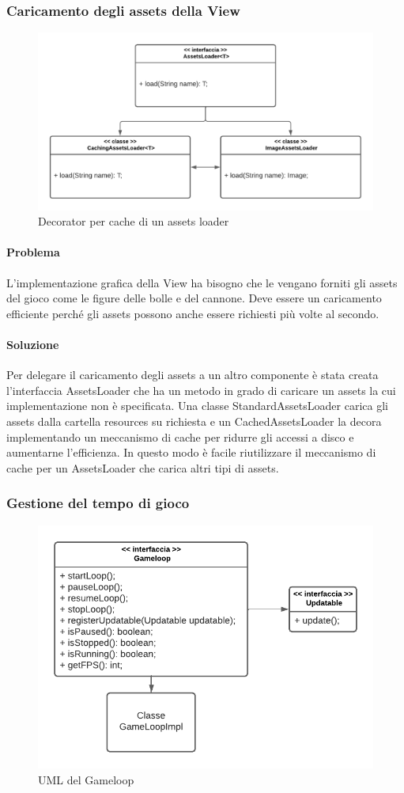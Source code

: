 \documentclass[a4paper,12pt]{report}
\begin{document}
\subsubsection{Caricamento degli assets della View}

\begin{figure}[H]
	\centering{}
	\includegraphics[width=.7\textwidth]{img/assetsloader}
	\caption{Decorator per cache di un assets loader}
\end{figure}

\paragraph{Problema} L'implementazione grafica della View ha bisogno che le vengano forniti gli assets del gioco come le figure delle bolle e del cannone. Deve essere un caricamento efficiente perché gli assets
possono anche essere richiesti più volte al secondo.

\paragraph{Soluzione} Per delegare il caricamento degli assets a un altro componente è stata creata l'interfaccia AssetsLoader che ha un metodo in grado di caricare un assets la cui implementazione
non è specificata. Una classe StandardAssetsLoader carica gli assets dalla cartella resources su richiesta e un CachedAssetsLoader la decora implementando un meccanismo di cache per ridurre gli accessi a disco
e aumentarne l'efficienza. In questo modo è facile riutilizzare il meccanismo di cache per un AssetsLoader che carica altri tipi di assets.

\subsubsection{Gestione del tempo di gioco}

\begin{figure}[H]
	\centering{}
	\includegraphics[width=.7\textwidth]{img/gameloop.pdf}
	\caption{UML del Gameloop}
\end{figure}
\end{document}
